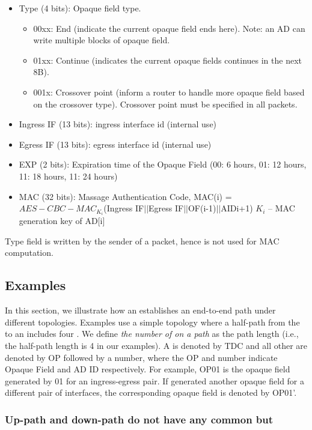 \begin{itemize}
\begin{itemize}
	\item{Type (4 bits): } Opaque field type. 
		\begin{itemize}
		\item{00xx}: End (indicate the current opaque field ends here). Note: an AD can write multiple blocks of opaque field.
		\item{01xx}: Continue (indicates the current opaque fields continues in the next 8B).
		\item{001x}: Crossover point (inform a router to handle more opaque field based on the crossover type). Crossover point must be specified in all packets.
		\end{itemize}
	\item{Ingress IF (13 bits): } ingress interface id (internal use)
	\item{Egress IF (13 bits): } egress interface id (internal use)
	\item{EXP (2 bits): } Expiration time of the Opaque Field (00: 6 hours, 01: 12 hours, 11: 18 hours, 11: 24 hours)
	\item{MAC (32 bits): } Massage Authentication Code, MAC(i) = $AES-CBC-MAC_{K_i}$(Ingress IF$||$Egress IF$||$OF(i-1)$||$AIDi+1)\newline
		$K_i$ – MAC generation key of AD[i]
	\end{itemize}
Type field is written by the sender of a packet, hence is not used for MAC computation.
\end{itemize}

\subsection{Examples}
In this section, we illustrate how an \AD establishes an end-to-end path under different topologies. Examples use a simple topology where a half-path from the \TDC to an \STUB \AD includes four \ADs. We define {\em the number of \ADs on a path} as the path length (i.e., the half-path length is 4 in our examples). A \TDC \AD is denoted by TDC and all other \ADs are denoted by OP followed by a number, where the OP and number indicate Opaque Field and AD ID respectively. For example, OP01 is the opaque field generated by  01 for an ingress-egress pair. If  generated another opaque field for a different pair of interfaces, the corresponding opaque field is denoted by OP01'.

\subsubsection{Up-path and down-path do not have any common \AD but \TDC}

